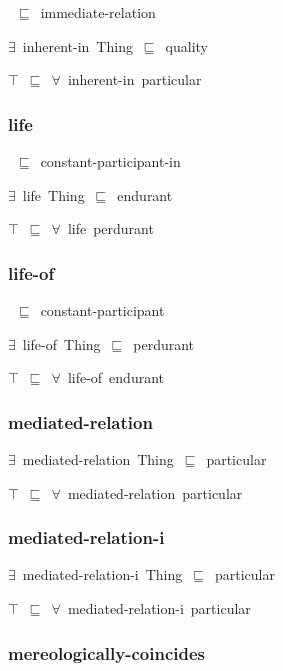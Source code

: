 \documentclass{article}
\begin{document}
~\ensuremath{\sqsubseteq}~immediate-relation

\ensuremath{\exists}~inherent-in~Thing~\ensuremath{\sqsubseteq}~quality

\ensuremath{\top}~\ensuremath{\sqsubseteq}~\ensuremath{\forall}~inherent-in~particular

\subsubsection*{life}

~\ensuremath{\sqsubseteq}~constant-participant-in

\ensuremath{\exists}~life~Thing~\ensuremath{\sqsubseteq}~endurant

\ensuremath{\top}~\ensuremath{\sqsubseteq}~\ensuremath{\forall}~life~perdurant

\subsubsection*{life-of}

~\ensuremath{\sqsubseteq}~constant-participant

\ensuremath{\exists}~life-of~Thing~\ensuremath{\sqsubseteq}~perdurant

\ensuremath{\top}~\ensuremath{\sqsubseteq}~\ensuremath{\forall}~life-of~endurant

\subsubsection*{mediated-relation}

\ensuremath{\exists}~mediated-relation~Thing~\ensuremath{\sqsubseteq}~particular

\ensuremath{\top}~\ensuremath{\sqsubseteq}~\ensuremath{\forall}~mediated-relation~particular

\subsubsection*{mediated-relation-i}

\ensuremath{\exists}~mediated-relation-i~Thing~\ensuremath{\sqsubseteq}~particular

\ensuremath{\top}~\ensuremath{\sqsubseteq}~\ensuremath{\forall}~mediated-relation-i~particular

\subsubsection*{mereologically-coincides}
\end{document}

